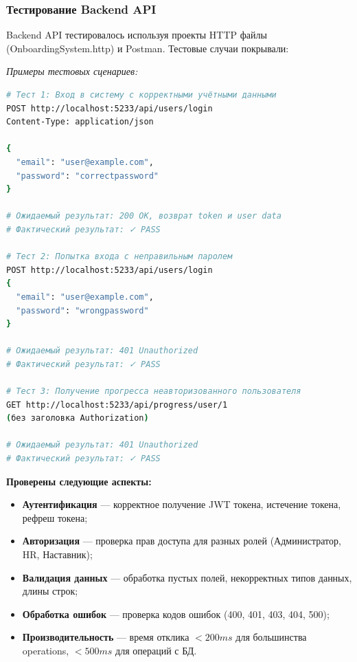 \subsubsection{Тестирование Backend API}

Backend API тестировалось используя проекты HTTP файлы (OnboardingSystem.http) и Postman. Тестовые случаи покрывали:

\textit{Примеры тестовых сценариев:}

\begin{lstlisting}[language=bash, basicstyle=\ttfamily\small]
# Тест 1: Вход в систему с корректными учётными данными
POST http://localhost:5233/api/users/login
Content-Type: application/json

{
  "email": "user@example.com",
  "password": "correctpassword"
}

# Ожидаемый результат: 200 OK, возврат token и user data
# Фактический результат: ✓ PASS

# Тест 2: Попытка входа с неправильным паролем
POST http://localhost:5233/api/users/login
{
  "email": "user@example.com",
  "password": "wrongpassword"
}

# Ожидаемый результат: 401 Unauthorized
# Фактический результат: ✓ PASS

# Тест 3: Получение прогресса неавторизованного пользователя
GET http://localhost:5233/api/progress/user/1
(без заголовка Authorization)

# Ожидаемый результат: 401 Unauthorized
# Фактический результат: ✓ PASS
\end{lstlisting}

\textbf{Проверены следующие аспекты:}

\begin{itemize}
    \item \textbf{Аутентификация} --- корректное получение JWT токена, истечение токена, рефреш токена;
    \item \textbf{Авторизация} --- проверка прав доступа для разных ролей (Администратор, HR, Наставник);
    \item \textbf{Валидация данных} --- обработка пустых полей, некорректных типов данных, длины строк;
    \item \textbf{Обработка ошибок} --- проверка кодов ошибок (400, 401, 403, 404, 500);
    \item \textbf{Производительность} --- время отклика $< 200ms$ для большинства operations, $< 500ms$ для операций с БД.
\end{itemize}


